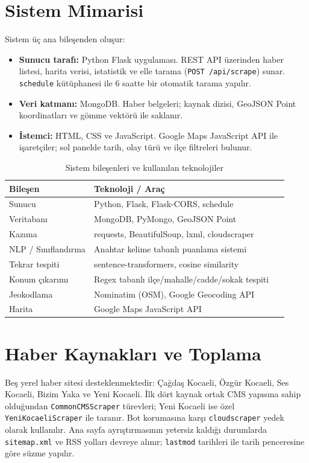 \documentclass[conference,a4paper]{IEEEtran}
\begin{document}
\section{Sistem Mimarisi}
Sistem üç ana bileşenden oluşur:
\begin{itemize}
    \item \textbf{Sunucu tarafı:} Python Flask uygulaması. REST API üzerinden haber listesi, harita verisi, istatistik ve elle tarama (\texttt{POST /api/scrape}) sunar. \texttt{schedule} kütüphanesi ile 6 saatte bir otomatik tarama yapılır.
    \item \textbf{Veri katmanı:} MongoDB. Haber belgeleri; kaynak dizisi, GeoJSON Point koordinatları ve gömme vektörü ile saklanır.
    \item \textbf{İstemci:} HTML, CSS ve JavaScript. Google Maps JavaScript API ile işaretçiler; sol panelde tarih, olay türü ve ilçe filtreleri bulunur.
\end{itemize}

\begin{table}[!t]
\centering
\caption{Sistem bileşenleri ve kullanılan teknolojiler}
\label{tab:tech}
\begin{tabular}{@{}p{0.28\linewidth}p{0.64\linewidth}@{}}
\toprule
\textbf{Bileşen} & \textbf{Teknoloji / Araç} \\
\midrule
Sunucu & Python, Flask, Flask-CORS, schedule \\
Veritabanı & MongoDB, PyMongo, GeoJSON Point \\
Kazıma & requests, BeautifulSoup, lxml, cloudscraper \\
NLP / Sınıflandırma & Anahtar kelime tabanlı puanlama sistemi \\
Tekrar tespiti & sentence-transformers, cosine similarity \\
Konum çıkarımı & Regex tabanlı ilçe/mahalle/cadde/sokak tespiti \\
Jeokodlama & Nominatim (OSM), Google Geocoding API \\
Harita & Google Maps JavaScript API \\
\bottomrule
\end{tabular}
\end{table}

\section{Haber Kaynakları ve Toplama}
Beş yerel haber sitesi desteklenmektedir: Çağdaş Kocaeli, Özgür Kocaeli, Ses Kocaeli, Bizim Yaka ve Yeni Kocaeli. İlk dört kaynak ortak CMS yapısına sahip olduğundan \texttt{CommonCMSScraper} türevleri; Yeni Kocaeli ise özel \texttt{YeniKocaeliScraper} ile taranır. Bot korumasına karşı \texttt{cloudscraper} yedek olarak kullanılır. Ana sayfa ayrıştırmasının yetersiz kaldığı durumlarda \texttt{sitemap.xml} ve RSS yolları devreye alınır; \texttt{lastmod} tarihleri ile tarih penceresine göre süzme yapılır.
\end{document}

